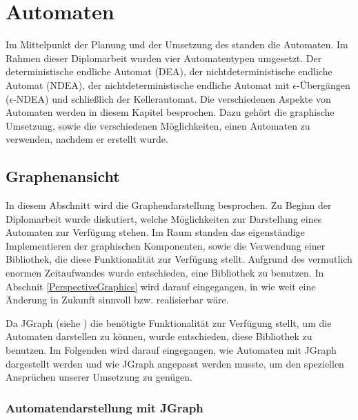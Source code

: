



\chapter{Automaten}\label{Machines}

Im Mittelpunkt der Planung und der Umsetzung des \gtitools standen die Automaten.
Im Rahmen dieser Diplomarbeit wurden vier Automatentypen umgesetzt. Der
deterministische endliche Automat (DEA), der nichtdeterministische endliche
Automat (NDEA), der nichtdeterministische endliche Automat mit
$\epsilon$-Übergängen ($\epsilon$-NDEA) und schließlich der Kellerautomat. Die
verschiedenen Aspekte von Automaten werden in diesem Kapitel besprochen. Dazu
gehört die graphische Umsetzung, sowie die verschiedenen Möglichkeiten,
einen Automaten zu verwenden, nachdem er erstellt wurde.\vspace{10pt}


\section{Graphenansicht}\label{Graph}

In diesem Abschnitt wird die Graphendarstellung besprochen. Zu Beginn der
Diplomarbeit wurde diskutiert, welche Möglichkeiten zur Darstellung eines
Automaten zur Verfügung stehen. Im Raum standen das eigenständige
Implementieren der graphischen Komponenten, sowie die Verwendung einer
Bibliothek, die diese Funktionalität zur Verfügung stellt. Aufgrund des
vermutlich enormen Zeitaufwandes wurde entschieden, eine Bibliothek zu benutzen.
In Abschnit \ref{PerspectiveGraphics} wird darauf eingegangen, in wie weit eine
Änderung in Zukunft sinnvoll bzw. realisierbar wäre.\vspace{10pt} 

Da JGraph (siehe \cite{jgraph}) die benötigte Funktionalität zur Verfügung
stellt, um die Automaten darstellen zu können, wurde entschieden, diese
Bibliothek zu benutzen. Im Folgenden wird darauf eingegangen, wie Automaten mit
JGraph dargestellt werden und wie JGraph angepasst werden musste, um den
speziellen Ansprüchen unserer Umsetzung zu genügen.\vspace{10pt}


\subsection{Automatendarstellung mit JGraph}\label{GraphJGraph}

